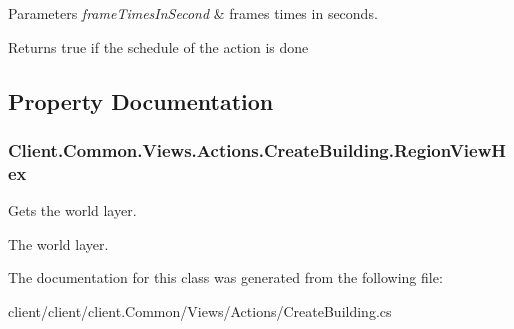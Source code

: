 \begin{DoxyParams}{Parameters}
{\em frame\+Times\+In\+Second} & frames times in seconds.\\
\hline
\end{DoxyParams}
\begin{DoxyReturn}{Returns}
true if the schedule of the action is done
\end{DoxyReturn}


\subsection{Property Documentation}
\hypertarget{classClient_1_1Common_1_1Views_1_1Actions_1_1CreateBuilding_ab73f911ae98f56d040a6eb03e50f451f}{}
\subsubsection[{Region\+View\+Hex}]{ Client.\+Common.\+Views.\+Actions.\+Create\+Building.\+Region\+View\+Hex\hspace{0.3cm}{\ttfamily [get]}}\label{classClient_1_1Common_1_1Views_1_1Actions_1_1CreateBuilding_ab73f911ae98f56d040a6eb03e50f451f}


Gets the world layer. 

The world layer.

The documentation for this class was generated from the following file\+:\begin{DoxyCompactItemize}
\item 
client/client/client.\+Common/\+Views/\+Actions/Create\+Building.\+cs\end{DoxyCompactItemize}

